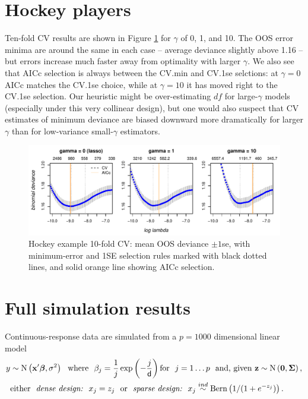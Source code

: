 \documentclass[12pt]{article}
\newcommand{\bs}[1]{\boldsymbol{#1}}
\newcommand{\mr}[1]{\mathrm{#1}}
\newcommand{\bm}[1]{\mathbf{#1}}
\begin{document}
\section{Hockey players}

Ten-fold CV results are shown in Figure
\ref{nhlcv} for $\gamma$ of 0, 1, and 10.  The OOS error minima are around the
same in each case -- average deviance slightly above 1.16 -- but errors
increase much faster away from optimality with larger $\gamma$.   We also see
that AICc selection is always between the CV.min and CV.1se selctions:  at
$\gamma=0$ AICc matches the CV.1se choice, while at $\gamma=10$ it has moved
right to the CV.1se  selection.  Our heuristic might be
over-estimating $df$ for large-$\gamma$ models (especially under this very
collinear design), but one would also suspect that CV estimates of minimum
deviance are biased downward more dramatically for larger $\gamma$ than for
low-variance small-$\gamma$ estimators.


\begin{figure}[h!]
\includegraphics[width=\textwidth]{graphs/nhl_cv}
\caption{\label{nhlcv} Hockey example 10-fold CV: mean OOS deviance $\pm 1$se, with minimum-error and 1SE selection rules marked with black dotted lines, and solid orange line showing AICc selection. }
\end{figure}


\section{Full simulation results}

Continuous-response data are simulated from
 a $p=1000$ dimensional linear model
\begin{align}
\label{simdgp-both}
y &\sim \mr{N}\left(\bm{x}'\bs{\beta},\sigma^2\right) ~~\text{where}~~
\beta_j = \frac{1}{j}\exp\left(-\frac{j}{{\sf d}} \right)\text{for}~~j=1\dots p~~\text{and,~given~}\bm{z} \sim \mr{N}\left(\bm{0},\bs{\Sigma}\right)\notag,\\
&\text{either}~~\textit{dense design:~~} x_j=z_j ~~\text{or}~~ \textit{sparse design:~~} 
x_j \stackrel{ind}{\sim} \mr{Bern}\left( 1/(1+e^{-z_j})\right).
\end{align}
\end{document}
